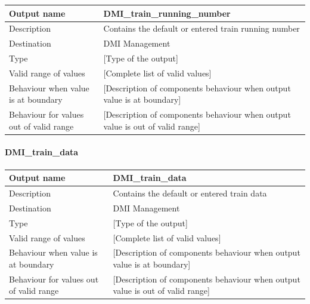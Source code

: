 \begin{longtable}{p{}p{}}
\toprule
Output name				& DMI\_train\_running\_number \\
\midrule
Description				& Contains the default or entered train running number \\
\midrule
Destination				& DMI Management \\ 
\midrule
Type					& [Type of the output] \\
\midrule
Valid range of values	& [Complete list of valid values] \\
\midrule
Behaviour when value is at boundary	& [Description of components behaviour when output value is at boundary] \\
\midrule
Behaviour for values out of valid range	& [Description of components behaviour when output value is out of valid range] \\
\bottomrule
\end{longtable}

\paragraph{DMI\_train\_data}

\begin{longtable}{p{}p{}}
\toprule
Output name				& DMI\_train\_data \\
\midrule
Description				& Contains the default or entered train data \\
\midrule
Destination				& DMI Management \\ 
\midrule
Type					& [Type of the output] \\
\midrule
Valid range of values	& [Complete list of valid values] \\
\midrule
Behaviour when value is at boundary	& [Description of components behaviour when output value is at boundary] \\
\midrule
Behaviour for values out of valid range	& [Description of components behaviour when output value is out of valid range] \\
\bottomrule
\end{longtable}





%


